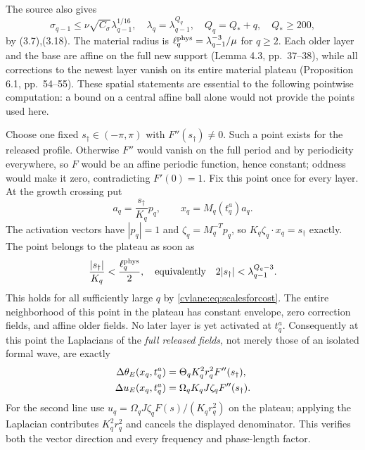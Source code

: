The source also gives
\begin{equation}
 \sigma_{q-1}\leq\nu\sqrt{C_\sigma}\lambda_{q-1}^{1/16},
 \quad \lambda_q=\lambda_{q-1}^{Q_q},\quad Q_q=Q_*+q,
 \quad Q_*\geq200,
 \label{cvlane:eq:scalesforcost}
\end{equation}
by (3.7),(3.18). The material radius is
$\ell_q^{\rm phys}=\lambda_{q-1}^{-3}/\mu$ for $q\geq2$.
Each older layer and the base are affine on the full new support
(Lemma 4.3, pp.~37--38), while all corrections to the newest
layer vanish on its entire material plateau (Proposition 6.1,
pp.~54--55). These spatial statements are essential to the following
pointwise computation: a bound on a central affine ball alone
would not provide the points used here.

Choose one fixed $s_\dagger\in(-\pi,\pi)$ with
$F''(s_\dagger)\ne0$. Such a point exists for the released
profile. Otherwise $F''$ would vanish on the full period and by
periodicity everywhere, so $F$ would be an affine periodic
function, hence constant; oddness would make it zero, contradicting
$F'(0)=1$. Fix this point once for every layer. At the growth
crossing put
\begin{equation}
 a_q=\frac{s_\dagger}{K_q}p_q,\qquad
 x_q=M_q(t_q^a)a_q.
 \label{cvlane:eq:testpoint}
\end{equation}
The activation vectors have $|p_q|=1$ and
$\zeta_q=M_q^{-T}p_q$, so
$K_q\zeta_q\cdot x_q=s_\dagger$ exactly. The point belongs
to the plateau as soon as
\[
 \frac{|s_\dagger|}{K_q}<\frac{\ell_q^{\rm phys}}2,
 \quad\hbox{equivalently}\quad
 2|s_\dagger|<\lambda_{q-1}^{Q_q-3}.
\]
This holds for all sufficiently large $q$ by
\eqref{cvlane:eq:scalesforcost}. The entire neighborhood of this point
in the plateau has constant envelope, zero correction fields,
and affine older fields. No later layer is yet activated at
$t_q^a$. Consequently at this point the Laplacians of the
\emph{full released fields}, not merely those of an isolated
formal wave, are exactly
\begin{align}
 \Delta\theta_E(x_q,t_q^a)
 &=\Theta_q K_q^2r_q^2F''(s_\dagger),\notag\\
 \Delta u_E(x_q,t_q^a)
 &=\Omega_qK_qJ\zeta_q F''(s_\dagger).
 \label{cvlane:eq:fulllaplacians}
\end{align}
For the second line use
$u_q=\Omega_q J\zeta_qF(s)/(K_qr_q^2)$ on the plateau;
applying the Laplacian contributes $K_q^2r_q^2$ and cancels
the displayed denominator. This verifies both the vector
direction and every frequency and phase-length factor.

